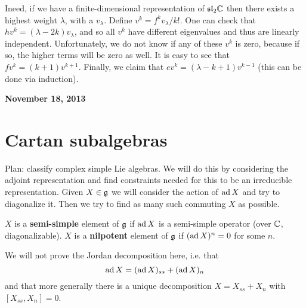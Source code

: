 \documentclass{../mathnotes}
\begin{document}
Ineed, if we have a finite-dimensional representation of $\mathfrak{sl}_2\mathbb{C}$ then there exists a highest weight $\lambda$, with a $v_\lambda$.
Define $v^k=f^kv_\lambda/k!$. One can check that $hv^k=(\lambda-2k)v_\lambda$, and so all $v^k$ have different eigenvalues and thus are
linearly independent. Unfortunately, we do not know if any of these $v^k$ is zero, because if so, the higher terms will be zero as well.
It is easy to see that $fv^k=(k+1)v^{k+1}$. Finally, we claim that $ev^k=\left( \lambda-k+1 \right)v^{k-1}$ (this can be done via induction).

\textbf{November 18, 2013}

\section{Cartan subalgebras}

Plan: classify complex simple Lie algebras.
We will do this by considering the adjoint representation and find constraints needed for this to be an irreducible representation.
Given $X\in\mathfrak g$ we will consider the action of $\operatorname{ad} X$ and try to diagonalize it. Then we try to find as many such commuting $X$ as possible.

\begin{defn}
    $X$ is a \textbf{semi-simple} element of $\mathfrak g$ if $\operatorname{ad} X$ is a semi-simple operator (over $\mathbb{C}$, diagonalizable).
    $X$ is a \textbf{nilpotent} element of $\mathfrak g$ if $(\operatorname{ad} X)^n=0$ for some $n$.
\end{defn}

We will not prove the Jordan decomposition here, i.e. that
\[\operatorname{ad} X=(\operatorname{ad} X)_{ss}+(\operatorname{ad} X)_n\]
and that more generally there is a unique decomposition $X=X_{ss}+X_n$ with $[X_{ss},X_n]=0$.
\end{document}

